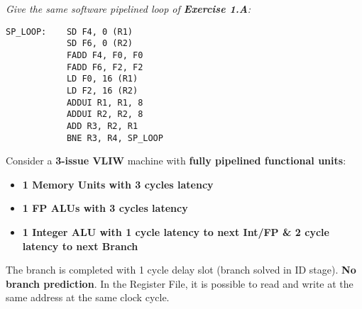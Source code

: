 \emph{Give the same software pipelined loop of \textbf{Exercise 1.A}:}
\begin{lstlisting}
SP_LOOP:    SD F4, 0 (R1)
            SD F6, 0 (R2)
            FADD F4, F0, F0
            FADD F6, F2, F2
            LD F0, 16 (R1)
            LD F2, 16 (R2)
            ADDUI R1, R1, 8
            ADDUI R2, R2, 8
            ADD R3, R2, R1
            BNE R3, R4, SP_LOOP
\end{lstlisting}
Consider a \textbf{3-issue VLIW} machine with \textbf{fully pipelined functional units}:
\begin{itemize}
    \item \textbf{1 Memory Units with 3 cycles latency}
    \item \textbf{1 FP ALUs with 3 cycles latency}
    \item \textbf{1 Integer ALU with 1 cycle latency to next Int/FP \& 2 cycle latency to next Branch}
\end{itemize}
The branch is completed with 1 cycle delay slot (branch solved in ID stage). \textbf{No branch prediction}. In the Register File, it is possible to read and write at the same address at the same clock cycle.
